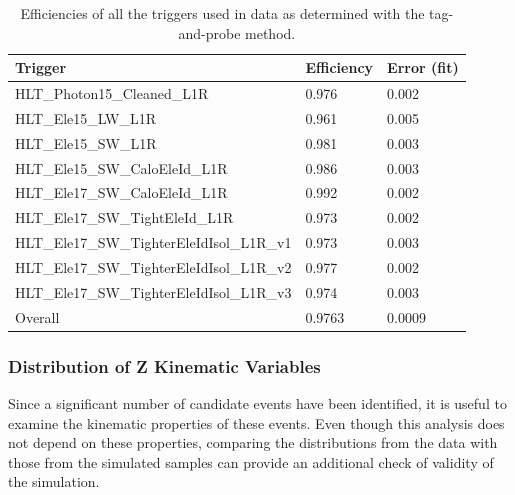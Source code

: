 
\begin{table}[htbp]
  \begin{center}
    \caption[Efficiencies of data trigger paths]{Efficiencies of all the triggers used in data as determined with the tag-and-probe method.}
    \label{TableTriggerEfficiencies}
    \begin{tabular}[]{ | l | l | l | }
      \hline
      Trigger	& Efficiency & Error (fit) \\ \hline \hline
      HLT\_Photon15\_Cleaned\_L1R & 0.976 & 0.002 \\ \hline
      HLT\_Ele15\_LW\_L1R & 0.961 & 0.005 \\ \hline
      HLT\_Ele15\_SW\_L1R & 0.981 & 0.003 \\ \hline
      HLT\_Ele15\_SW\_CaloEleId\_L1R & 0.986 & 0.003 \\ \hline
      HLT\_Ele17\_SW\_CaloEleId\_L1R & 0.992 & 0.002 \\ \hline
      HLT\_Ele17\_SW\_TightEleId\_L1R & 0.973 & 0.002 \\ \hline
      HLT\_Ele17\_SW\_TighterEleIdIsol\_L1R\_v1 & 0.973 & 0.003 \\ \hline
      HLT\_Ele17\_SW\_TighterEleIdIsol\_L1R\_v2 & 0.977 & 0.002 \\ \hline
      HLT\_Ele17\_SW\_TighterEleIdIsol\_L1R\_v3 & 0.974 & 0.003 \\ \hline
      Overall & 0.9763 & 0.0009 \\ \hline
    \end{tabular}
  \end{center}
\end{table}

\subsubsection{Distribution of Z Kinematic Variables}
\label{evSel:Zquants}
Since a significant number of \Zee candidate events have been identified, 
it is useful to examine the kinematic properties of these events.  
Even though this analysis does not depend on these properties, 
comparing the distributions from the data with those from the simulated samples 
can provide an additional check of validity of the simulation.  

